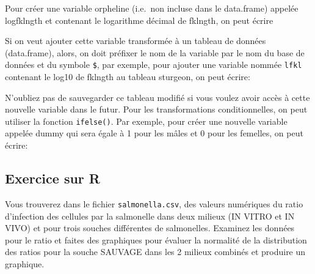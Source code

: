 \documentclass[12pt,]{book}
\newenvironment{Shaded}{\begin{snugshade}}{\end{snugshade}}
\newcommand{\DecValTok}[1]{\textcolor[rgb]{0.00,0.00,0.81}{#1}}
\newcommand{\KeywordTok}[1]{\textcolor[rgb]{0.13,0.29,0.53}{\textbf{#1}}}
\newcommand{\NormalTok}[1]{#1}
\newcommand{\OperatorTok}[1]{\textcolor[rgb]{0.81,0.36,0.00}{\textbf{#1}}}
\newcommand{\StringTok}[1]{\textcolor[rgb]{0.31,0.60,0.02}{#1}}
\begin{document}
Pour créer une variable orpheline (i.e.~non incluse dans le data.frame) appelée logfklngth et contenant le logarithme décimal de fklngth, on peut écrire

\begin{Shaded}
\end{Shaded}

Si on veut ajouter cette variable transformée à un tableau de données (data.frame), alors, on doit préfixer le nom de la variable par le nom du base de données et du symbole \texttt{\$}, par exemple, pour ajouter une variable nommée \texttt{lfkl} contenant le log10 de fklngth au tableau sturgeon, on peut écrire:

\begin{Shaded}
\end{Shaded}

N'oubliez pas de sauvegarder ce tableau modifié si vous voulez avoir accès à cette nouvelle variable dans le futur.
Pour les transformations conditionnelles, on peut utiliser la fonction \texttt{ifelse()}.
Par exemple, pour créer une nouvelle variable appelée dummy qui sera égale à 1 pour les mâles et 0 pour les femelles, on peut écrire:

\begin{Shaded}
\end{Shaded}

\hypertarget{exercice-sur-r}{%
\subsection{Exercice sur R}\label{exercice-sur-r}}

Vous trouverez dans le fichier \texttt{salmonella.csv}, des valeurs numériques du ratio d'infection des cellules par la salmonelle dans deux milieux (IN VITRO et IN VIVO) et pour trois souches différentes de salmonelles.
Examinez les données pour le ratio et faites des graphiques pour évaluer la normalité de la distribution des ratios pour la souche SAUVAGE dans les 2 milieux combinés et produire un graphique.
\end{document}
